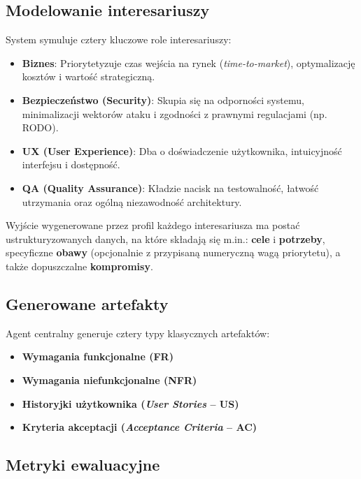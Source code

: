 \documentclass[conference]{IEEEtran}
\begin{document}
\subsection{Modelowanie interesariuszy}

System symuluje cztery kluczowe role interesariuszy:

\begin{itemize}
\item \textbf{Biznes}: Priorytetyzuje czas wejścia na rynek (\textit{time-to-market}), optymalizację kosztów i wartość strategiczną.
\item \textbf{Bezpieczeństwo (Security)}: Skupia się na odporności systemu, minimalizacji wektorów ataku i zgodności z prawnymi regulacjami (np. RODO).
\item \textbf{UX (User Experience)}: Dba o doświadczenie użytkownika, intuicyjność interfejsu i dostępność.
\item \textbf{QA (Quality Assurance)}: Kładzie nacisk na testowalność, łatwość utrzymania oraz ogólną niezawodność architektury.
\end{itemize}

Wyjście wygenerowane przez profil każdego interesariusza ma postać ustrukturyzowanych danych, na które składają się m.in.:
\textbf{cele} i \textbf{potrzeby}, specyficzne \textbf{obawy} (opcjonalnie z przypisaną numeryczną wagą priorytetu), a także dopuszczalne \textbf{kompromisy}.

\subsection{Generowane artefakty}

Agent centralny generuje cztery typy klasycznych artefaktów:

\begin{itemize}
\item \textbf{Wymagania funkcjonalne (FR)}
\item \textbf{Wymagania niefunkcjonalne (NFR)}
\item \textbf{Historyjki użytkownika (\textit{User Stories} -- US)}
\item \textbf{Kryteria akceptacji (\textit{Acceptance Criteria} -- AC)}
\end{itemize}

\subsection{Metryki ewaluacyjne}
\end{document}
